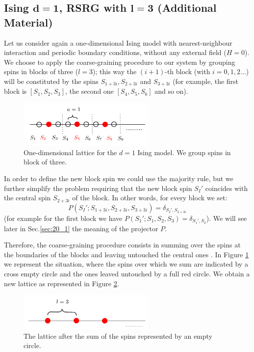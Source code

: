 \documentclass[../../Main/Main.tex]{subfiles}
\begin{document}
\subsection{Ising \( \pmb{d=1} \), RSRG with \( \pmb{l=3} \) (Additional Material)}
Let us consider again a one-dimensional Ising model with nearest-neighbour interaction and periodic boundary conditions, without any external field (\( H=0 \)). We choose to apply the coarse-graining procedure to our system by grouping spins in blocks of three (\( l=3 \)); this way the \( (i+1) \)-th  block (with \( i=0,1,2\dots \)) will be constituted by the spins \( S_{1+3i}, S_{2+3i} \) and \( S_{3+3i} \) (for example, the first block is \( [S_1,S_2,S_3] \), the second one \( [S_4,S_5,S_6] \) and so on).

\begin{figure}[H]
\centering
\includegraphics[width=0.6\textwidth]{./img/1.pdf}
\caption{\label{fig:20_1} One-dimensional lattice for the \( d=1 \) Ising model. We group spins in block of three.}
\end{figure}

In order to define the new block spin we could use the majority rule, but we further simplify the problem requiring that the new block spin \( S_I' \) coincides with the central spin \(  S_{2+3i} \) of the block.  In other words, for every block we set:
\begin{equation*}
  P(S_{I}';S_{1+3i},S_{2+3i},S_{3+3i})=\delta _{S_{I}',S_{2+3i}}
\end{equation*}
(for example for the first block we have \( P(S_{1}';S_{1},S_{2},S_{3})=\delta _{S_{1}',S_{2}} \)). We will see later in Sec.\ref{sec:20_1} the meaning of the projector \( P \).

Therefore, the coarse-graining procedure consists in summing over the spins at the boundaries of the blocks and leaving untouched the central ones . In Figure \ref{fig:20_1} we represent the situation, where the spins over which we sum are indicated by a cross empty circle and the ones leaved untouched by a full red circle.
We obtain a new lattice as represented in Figure \ref{fig:20_2}.


\begin{figure}[H]
\centering
\includegraphics[width=0.6\textwidth]{./img/2.pdf}
\caption{\label{fig:20_2} The lattice after the sum of the spins represented by an empty circle.}
\end{figure}
\end{document}
